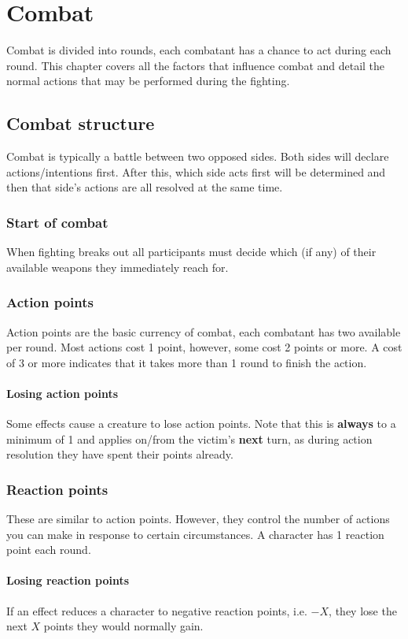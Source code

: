 \documentclass[a4paper,10pt,oneside]{book}
\begin{document}
\chapter{Combat}
\label{chap:combat}
Combat is divided into rounds, each combatant has a chance to act during each round. This chapter covers all the factors that influence combat and detail the normal actions that may be performed during the fighting.

\section{Combat structure}
Combat is typically a battle between two opposed sides. Both sides will declare actions/intentions first. After this, which side acts first will be determined and then that side's actions are all resolved at the same time.  

\subsection{Start of combat}
When fighting breaks out all participants must decide which (if any) of their available weapons they immediately reach for.

\subsection{Action points}
Action points are the basic currency of combat, each combatant has two available per round. Most actions cost 1 point, however, some cost 2 points or more. A cost of 3 or more indicates that it takes more than 1 round to finish the action. 

\subsubsection{Losing action points}
Some effects cause a creature to lose action points. Note that this is \textbf{always} to a minimum of 1 and applies on/from the victim's \textbf{next} turn, as during action resolution they have spent their points already.

\subsection{Reaction points}
These are similar to action points. However, they control the number of actions you can make in response to certain circumstances. A character has 1 reaction point each round.

\subsubsection{Losing reaction points}
If an effect reduces a character to negative reaction points, i.e. $-X$, they lose the next $X$ points they would normally gain.
\end{document}
